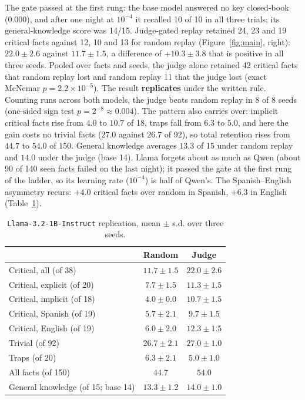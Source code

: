 \documentclass[11pt,a4paper]{article}
\begin{document}
The gate passed at the first rung: the base model answered no key closed-book (0.000), and after one night at $10^{-4}$ it recalled 10 of 10 in all three trials; its general-knowledge score was 14/15.
Judge-gated replay retained 24, 23 and 19 critical facts against 12, 10 and 13 for random replay (Figure~\ref{fig:main}, right): $22.0{\pm}2.6$ against $11.7{\pm}1.5$, a difference of $+10.3{\pm}3.8$ that is positive in all three seeds.
Pooled over facts and seeds, the judge alone retained 42 critical facts that random replay lost and random replay 11 that the judge lost (exact McNemar $p{=}2.2{\times}10^{-5}$).
The result \textbf{replicates} under the written rule.
Counting runs across both models, the judge beats random replay in 8 of 8 seeds (one-sided sign test $p{=}2^{-8}{\approx}0.004$).
The pattern also carries over: implicit critical facts rise from $4.0$ to $10.7$ of 18, traps fall from $6.3$ to $5.0$, and here the gain costs no trivial facts ($27.0$ against $26.7$ of 92), so total retention rises from $44.7$ to $54.0$ of 150.
General knowledge averages $13.3$ of 15 under random replay and $14.0$ under the judge (base 14).
Llama forgets about as much as Qwen (about 90 of 140 seen facts failed on the last night); it passed the gate at the first rung of the ladder, so its learning rate ($10^{-4}$) is half of Qwen's.
The Spanish--English asymmetry recurs: $+4.0$ critical facts over random in Spanish, $+6.3$ in English (Table~\ref{tab:llama}).

\begin{table}[htbp]
\centering
\small
\begin{tabular}{lcc}
\toprule
 & Random & Judge\\
\midrule
Critical, all (of 38) & $11.7{\pm}1.5$ & $22.0{\pm}2.6$\\
Critical, explicit (of 20) & $7.7{\pm}1.5$ & $11.3{\pm}1.5$\\
Critical, implicit (of 18) & $4.0{\pm}0.0$ & $10.7{\pm}1.5$\\
Critical, Spanish (of 19) & $5.7{\pm}2.1$ & $9.7{\pm}1.5$\\
Critical, English (of 19) & $6.0{\pm}2.0$ & $12.3{\pm}1.5$\\
\midrule
Trivial (of 92) & $26.7{\pm}2.1$ & $27.0{\pm}1.0$\\
Traps (of 20) & $6.3{\pm}2.1$ & $5.0{\pm}1.0$\\
All facts (of 150) & $44.7$ & $54.0$\\
General knowledge (of 15; base 14) & $13.3{\pm}1.2$ & $14.0{\pm}1.0$\\
\bottomrule
\end{tabular}
\caption{\texttt{Llama-3.2-1B-Instruct} replication, mean $\pm$ s.d. over three seeds.}
\label{tab:llama}
\end{table}
\end{document}
